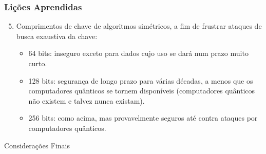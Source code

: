 \documentclass[compress]{beamer}
\begin{document}
\begin{frame}
\frametitle{Lições Aprendidas}
\justifying
	\begin{enumerate}
		\setcounter{enumi}{4}
		\item<+->{Comprimentos de chave de algoritmos simétricos, a fim de frustrar ataques de busca exaustiva da chave:}
		\begin{itemize}
			\item<+->{64 bits: inseguro exceto para dados cujo uso se dará num prazo muito curto.}
			\item<+->{128 bits: segurança de longo prazo para várias décadas, a menos que os computadores quânticos se tornem disponíveis (computadores quânticos não existem e talvez nunca existam).}
			\item<+->{256 bits: como acima, mas provavelmente seguros até contra ataques por computadores quânticos.}
		\end{itemize}
	\end{enumerate}
\end{frame}

\begin{frame}{Considerações Finais}
\end{frame}

\end{document}
